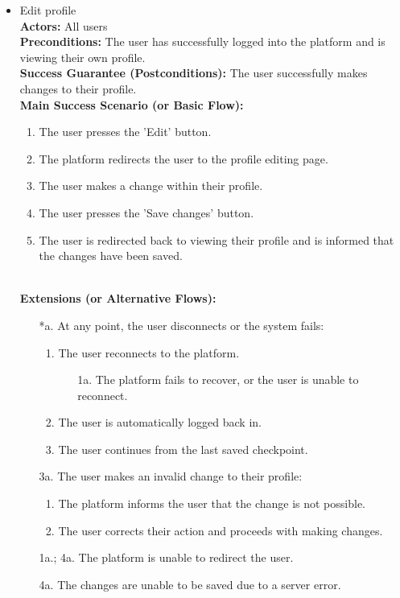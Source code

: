 \begin{itemize}[label={[\textbf{UC}]}, align=left, leftmargin=*]
        
     \item {} Edit profile \\
     \textbf{Actors:} All users\\
     \textbf{Preconditions:} The user has successfully logged into the platform and is viewing their own profile.\\
     \textbf{Success Guarantee (Postconditions):} The user successfully makes changes to their profile. \\
     \textbf{Main Success Scenario (or Basic Flow):} 
     \begin{enumerate}[label=\arabic*.] 
        \item The user presses the 'Edit' button.
        \item The platform redirects the user to the profile editing page.
        \item The user makes a change within their profile.
        \item The user presses the 'Save changes' button.
        \item The user is redirected back to viewing their profile and is informed that the changes have been saved.
     \end{enumerate} \\

    \textbf{Extensions (or Alternative Flows):} 
    \begin{enumerate}[label=\arabic*.]
        \item[*a.] At any point, the user disconnects or the system fails:
            \begin{enumerate}[label=\arabic*.]
                \item The user reconnects to the platform.
                    \begin{enumerate}[label=\alph*.]
                        \item[1a.] The platform fails to recover, or the user is unable to reconnect.
                    \end{enumerate}
                 \item The user is automatically logged back in.
                 \item The user continues from the last saved checkpoint.
            \end{enumerate}
        \item[3a.] The user makes an invalid change to their profile:
            \begin{enumerate}[label=\arabic*.]
                \item The platform informs the user that the change is not possible.
                \item The user corrects their action and proceeds with making changes.
            \end{enumerate}
        \item[1a.; 4a.] The platform is unable to redirect the user.
        \item[4a.] The changes are unable to be saved due to a server error.
        \end{enumerate}
\end{itemize}


